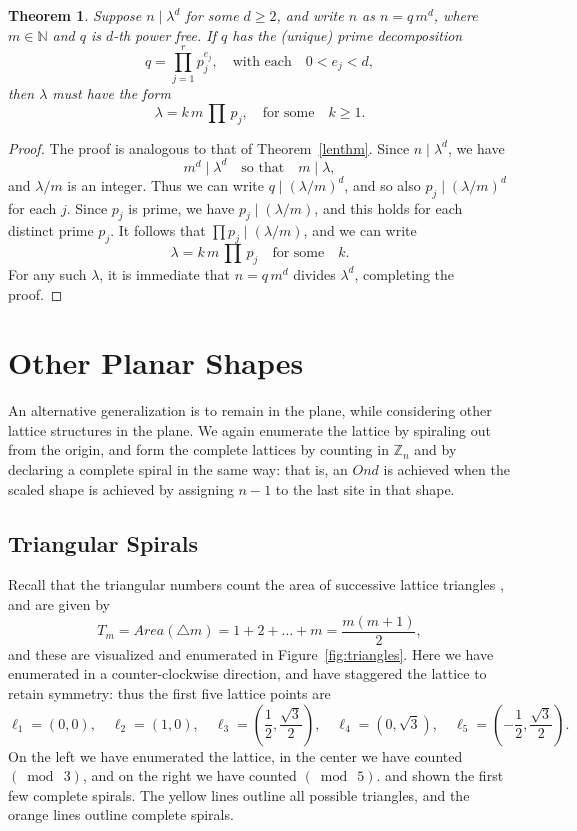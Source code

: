 \documentclass{article}
\newtheorem{theorem}{Theorem}
\theoremstyle{definition}
\def\ZZ{\mathbb{Z}}
\def\pmod#1{(\bmod\  #1)}
\def\com#1{\quad\text{{#1}}\quad}
\begin{document}
\begin{theorem}
\label{dimdthm}
Suppose $n\mid \lambda^d$ for some $d\ge 2$, and write $n$ as $n=q\,m^d$,
where $m \in \mathbb{N}$ and $q$ is $d$-th power free.  If $q$ has the
(unique) prime decomposition
\[
  q = \prod_{j=1}^{r} p_j^{e_j}, \com{with each}
  0<e_j<d,
\]
then $\lambda$ must have the form
\[
  \lambda = k \,m\, \textstyle{\prod}\, p_j, \com{for some}
  k \ge 1.
\]
\end{theorem}

\begin{proof}
The proof is analogous to that of Theorem~\ref{lenthm}.
Since $n\mid \lambda^d$, we have 
\[
  m^d\mid \lambda^d   \com{so that}
  m\mid \lambda ,
\]
and $\lambda/m$ is an integer.  Thus we can write $q\mid (\lambda/m)^d$,
and so also $p_j\mid (\lambda/m)^d$ for each $j$.  Since $p_j$ is prime,
we have $p_j\mid (\lambda/m)$, and this holds for each distinct prime
$p_j$.  It follows that $\prod p_j\mid (\lambda/m)$, and we can write
\[
  \lambda = k\, m\, \textstyle{\prod}\, p_j  \com{for some} k.
\]
For any such $\lambda$, it is immediate that $n=q\,m^d$ divides
$\lambda^d$, completing the proof.
\end{proof}

\section{Other Planar Shapes}

An alternative generalization is to remain in the plane, while
considering other lattice structures in the plane.  We again enumerate
the lattice by spiraling out from the origin, and form the complete
lattices by counting in $\ZZ_n$ and by declaring a complete spiral in
the same way: that is, an $Ond$ is achieved when the scaled shape is
achieved by assigning $n-1$ to the last site in that shape.

\subsection{Triangular Spirals}

Recall that the triangular numbers count the area of successive
lattice triangles \cite{OEIS}, and are given by
\[
  T_m = Area(\triangle m) = 1+2+\dots+m = \frac{m(m+1)}2,
\]
and these are visualized and enumerated in
Figure~\ref{fig:triangles}.  Here we have enumerated in a
counter-clockwise direction, and have staggered the lattice to retain
symmetry: thus the first five lattice points are
\[\textstyle{
  \ell_1 = (0,0), \quad
  \ell_2 = (1,0), \quad
  \ell_3 = (\frac12,\frac{\sqrt3}2), \quad
  \ell_4 = (0,\sqrt3), \quad
  \ell_5 = (-\frac12,\frac{\sqrt3}2).}
\]
On the left we have enumerated the lattice, in the center we have
counted $\pmod 3$, and on the right we have counted $\pmod 5$.  and
shown the first few complete spirals.  The yellow lines outline all
possible triangles, and the orange lines outline complete spirals.
\end{document}
